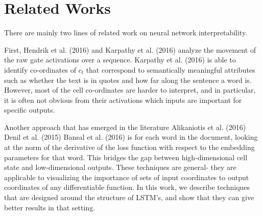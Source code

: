 \documentclass{article}
\begin{document}
\section{Related Works}

There are mainly two lines of related work on neural network interpretability.


First, Hendrik et al. (2016) and Karpathy et al. (2016) analyze the movement of the raw gate activations over a sequence.
Karpathy et al. (2016) is able to identify co-ordinates of $c_t$ that correspond to semantically meaningful attributes such as whether the text is in quotes and how far along the sentence a word is. However, most of the cell co-ordinates are harder to interpret, and in particular, it is often not obvious from their activations which inputs are important for specific outputs.

Another approach that has emerged in the literature Alikaniotis et al. (2016) Denil et al. (2015) Bansal et al. (2016) is for each word in the document, looking at the norm of the derivative of the loss function with respect to the embedding parameters for that word. This bridges the gap between high-dimensional cell state and low-dimensional outputs. These techniques are general- they are applicable to visualizing the importance of sets of input coordinates to output coordinates of any differentiable function. In this work, we describe techniques that are designed around the structure of LSTM’s, and show that they can give better results in that setting.

\end{document}
